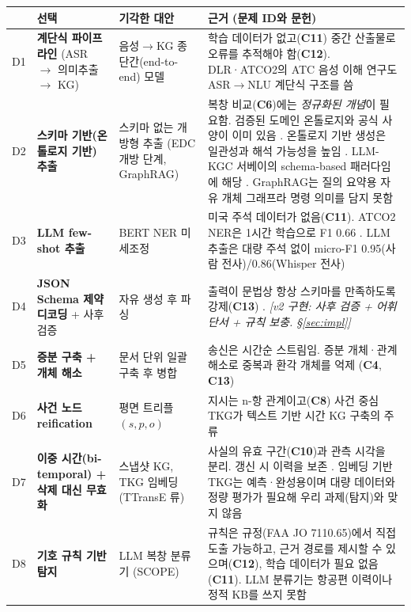 \documentclass[10pt,a4paper]{article}
\newcommand{\ch}[1]{\textbf{\textcolor{red!60!black}{#1}}}
\begin{document}
\begin{center}\small
\begin{tabularx}{\textwidth}{@{}l>{\raggedright\arraybackslash}p{3.1cm}>{\raggedright\arraybackslash}p{3.0cm}>{\raggedright\arraybackslash}X@{}}
\toprule
& 선택 & 기각한 대안 & 근거 (문제 ID와 문헌)\\\midrule
D1 & \textbf{계단식 파이프라인} (ASR $\to$ 의미추출 $\to$ KG) & 음성$\to$KG 종단간(end-to-end) 모델 & 학습 데이터가 없고(\ch{C11}) 중간 산출물로 오류를 추적해야 함(\ch{C12}). DLR·ATCO2의 ATC 음성 이해 연구도 ASR$\to$NLU 계단식 구조를 씀 \cite{kleinert2021,atco2}\\
D2 & \textbf{스키마 기반(온톨로지 기반) 추출} & 스키마 없는 개방형 추출 (EDC 개방 단계, GraphRAG) & 복창 비교(\ch{C6})에는 \emph{정규화된 개념}이 필요함. 검증된 도메인 온톨로지와 공식 사양이 이미 있음 \cite{dlr2025,helmke2018,chen2023,keller2017}. 온톨로지 기반 생성은 일관성과 해석 가능성을 높임 \cite{feng2024}. LLM-KGC 서베이의 schema-based 패러다임에 해당 \cite{llmkgc2025}. GraphRAG는 질의 요약용 자유 개체 그래프라 명령 의미를 담지 못함 \cite{graphrag}\\
D3 & \textbf{LLM few-shot 추출} & BERT NER 미세조정 & 미국 주석 데이터가 없음(\ch{C11}). ATCO2 NER은 1시간 학습으로 F1 0.66 \cite{atco2}. LLM 추출은 대량 주석 없이 micro-F1 0.95(사람 전사)/0.86(Whisper 전사) \cite{mekerishvili2025}\\
D4 & \textbf{JSON Schema 제약 디코딩} + 사후 검증 & 자유 생성 후 파싱 & 출력이 문법상 항상 스키마를 만족하도록 강제(\ch{C13}) \cite{willard2023}. \emph{[v2 구현: 사후 검증 + 어휘 단서 + 규칙 보충. \S\ref{sec:impl}]}\\
D5 & \textbf{증분 구축 + 개체 해소} & 문서 단위 일괄 구축 후 병합 & 송신은 시간순 스트림임. 증분 개체·관계 해소로 중복과 환각 개체를 억제 \cite{itext2kg}(\ch{C4}, \ch{C13})\\
D6 & \textbf{사건 노드 reification} & 평면 트리플 $(s,p,o)$ & 지시는 n-항 관계이고(\ch{C8}) 사건 중심 TKG가 텍스트 기반 시간 KG 구축의 주류 \cite{naryw3c,knez2023}\\
D7 & \textbf{이중 시간(bi-temporal) + 삭제 대신 무효화} & 스냅샷 KG, TKG 임베딩(TTransE 류) & 사실의 유효 구간(\ch{C10})과 관측 시각을 분리. 갱신 시 이력을 보존 \cite{zep2025,atom2025}. 임베딩 기반 TKG는 예측·완성용이며 대량 데이터와 정량 평가가 필요해 우리 과제(탐지)와 맞지 않음 \cite{cai2024tkg}\\
D8 & \textbf{기호 규칙 기반 탐지} & LLM 복창 분류기 (SCOPE) & 규칙은 규정(FAA JO 7110.65)에서 직접 도출 가능하고, 근거 경로를 제시할 수 있으며(\ch{C12}), 학습 데이터가 필요 없음(\ch{C11}). LLM 분류기는 항공편 이력이나 정적 KB를 쓰지 못함 \cite{scope2026,faa7110}\\

\end{tabularx}
\end{center}
\end{document}
